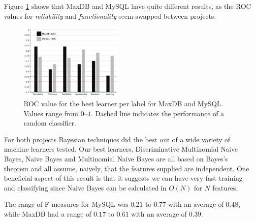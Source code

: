 \documentclass[smallextended]{svjour3}       %
\begin{document}
Figure \ref{fig:best-learn-per-tag} shows that MaxDB and MySQL have quite different results, as the ROC values for \emph{reliability} and \emph{functionality}
seem swapped between projects. 

\begin{figure}[t]
\centering
\includegraphics[width=0.45\textwidth]{figures/both-supervised}
\caption[]{ROC value for the best learner per label for MaxDB and MySQL. Values range from $0$--$1$.  Dashed line indicates the performance of a random
classifier.
}
\label{fig:best-learn-per-tag}
\end{figure}

For both projects Bayesian techniques did the best out of a wide variety of machine learners tested. 
Our best learners, Discriminative Multinomial Naive Bayes, Naive Bayes
and Multinomial Naive Bayes  are all based on Bayes's theorem and all
assume, naively, that the features supplied are independent. 
One beneficial aspect of this result is that it suggests we can have very fast training and classifying  since Naive Bayes can be calculated in $O(N)$
for $N$ features.


The range of F-measures for MySQL was $0.21$ to $0.77$ with an average
of $0.48$, while MaxDB had a range of $0.17$ to $0.61$ with an average
of $0.39$.
\end{document}

